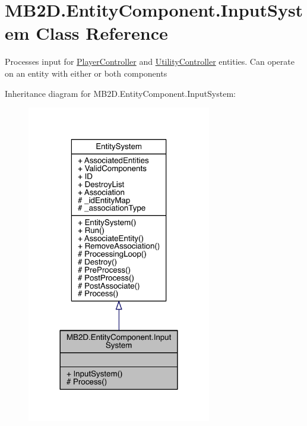 \hypertarget{class_m_b2_d_1_1_entity_component_1_1_input_system}{}\section{M\+B2\+D.\+Entity\+Component.\+Input\+System Class Reference}
\label{class_m_b2_d_1_1_entity_component_1_1_input_system}


Processes input for \hyperlink{class_m_b2_d_1_1_entity_component_1_1_player_controller}{Player\+Controller} and \hyperlink{class_m_b2_d_1_1_entity_component_1_1_utility_controller}{Utility\+Controller} entities. Can operate on an entity with either or both components  




Inheritance diagram for M\+B2\+D.\+Entity\+Component.\+Input\+System\+:
\nopagebreak
\begin{figure}[H]
\begin{center}
\leavevmode
\includegraphics[width=228pt]{class_m_b2_d_1_1_entity_component_1_1_input_system__inherit__graph}
\end{center}
\end{figure}


